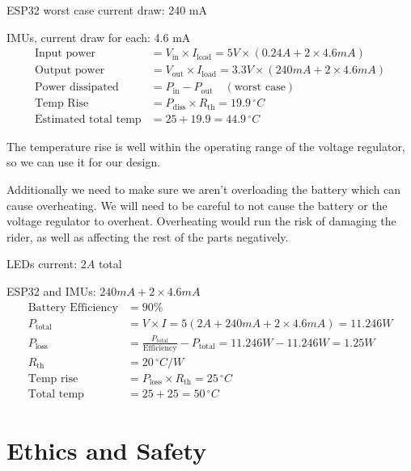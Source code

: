 \documentclass[12pt]{article}
\begin{document}
\noindent ESP32 worst case current draw: 240 mA

 IMUs, current draw for each: 4.6 mA
\begin{align*}
    \text{Input power} &= V_{\text{in}} \times I_{\text{load}} = 5V \times (0.24A + 2 \times 4.6mA) \\
    \text{Output power} &= V_{\text{out}} \times I_{\text{load}} = 3.3V \times (240mA + 2 \times 4.6mA) \\
    \text{Power dissipated} &= P_{\text{in}} - P_{\text{out}} \quad (\text{worst case}) \\
    \text{Temp Rise} &= P_{\text{diss}} \times R_{\text{th}} = 19.9 \, ^{\circ}C \\
    \text{Estimated total temp} &= 25 + 19.9 = 44.9 \, ^{\circ}C
\end{align*}

\noindent The temperature rise is well within the operating range of the voltage regulator, so we can use it for our design.


\noindent Additionally we need to make sure we aren’t 
overloading the battery which can cause overheating. We will 
need to be careful to not cause the battery or the voltage 
regulator to overheat. Overheating would run the risk of 
damaging the rider, as well as affecting the rest of the parts 
negatively.

\noindent LEDs current: \( 2A \) total 

\noindent ESP32 and IMUs: \( 240mA + 2 \times 4.6mA \)
\begin{align*}
\text{Battery Efficiency} &= 90\% \\
P_{\text{total}} &= V \times I = 5(2A + 240mA + 2 \times 4.6mA) = 11.246W \\
P_{\text{loss}} &= \frac{P_{\text{total}}}{\text{Efficiency}} - P_{\text{total}} = 11.246W - 11.246W = 1.25W \\
R_{\text{th}} &= 20 \, ^{\circ}C/W \\
\text{Temp rise} &= P_{\text{loss}} \times R_{\text{th}} = 25 \, ^{\circ}C \\
\text{Total temp} &= 25 + 25 = 50 \, ^{\circ}C
\end{align*}

\section{Ethics and Safety}
\end{document}
